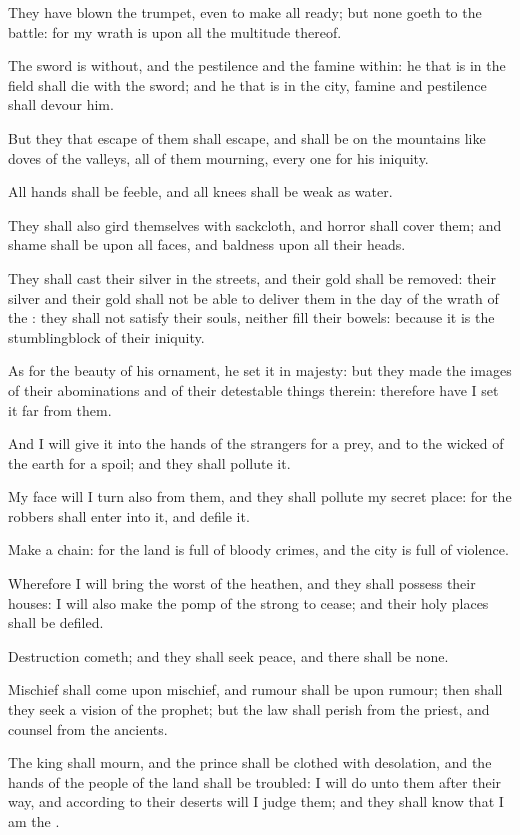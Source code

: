 \verse They have blown the trumpet, even to make all ready; but none goeth to the battle: for my wrath is upon all the multitude thereof.

\verse The sword is without, and the pestilence and the famine within: he that is in the field shall die with the sword; and he that is in the city, famine and pestilence shall devour him.

\verse But they that escape of them shall escape, and shall be on the mountains like doves of the valleys, all of them mourning, every one for his iniquity.

\verse All hands shall be feeble, and all knees shall be weak as water.

\verse They shall also gird themselves with sackcloth, and horror shall cover them; and shame shall be upon all faces, and baldness upon all their heads.

\verse They shall cast their silver in the streets, and their gold shall be removed: their silver and their gold shall not be able to deliver them in the day of the wrath of the \LORD: they shall not satisfy their souls, neither fill their bowels: because it is the stumblingblock of their iniquity.

\verse As for the beauty of his ornament, he set it in majesty: but they made the images of their abominations and of their detestable things therein: therefore have I set it far from them.

\verse And I will give it into the hands of the strangers for a prey, and to the wicked of the earth for a spoil; and they shall pollute it.

\verse My face will I turn also from them, and they shall pollute my secret place: for the robbers shall enter into it, and defile it.

\verse Make a chain: for the land is full of bloody crimes, and the city is full of violence.

\verse Wherefore I will bring the worst of the heathen, and they shall possess their houses: I will also make the pomp of the strong to cease; and their holy places shall be defiled.

\verse Destruction cometh; and they shall seek peace, and there shall be none.

\verse Mischief shall come upon mischief, and rumour shall be upon rumour; then shall they seek a vision of the prophet; but the law shall perish from the priest, and counsel from the ancients.

\verse The king shall mourn, and the prince shall be clothed with desolation, and the hands of the people of the land shall be troubled: I will do unto them after their way, and according to their deserts will I judge them; and they shall know that I am the \LORD.


